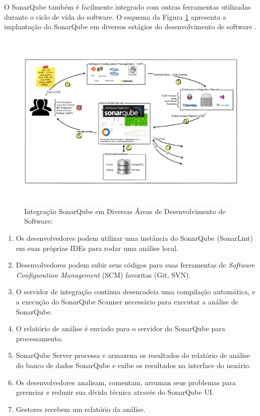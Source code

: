 O SonarQube também é facilmente integrado com outras ferramentas utilizadas durante o ciclo de vida do software. O esquema da Figura \ref{img:sonar_int} apresenta a implantação do SonarQube em diversos estágios do desenvolvimento de software \cite{sonar}.
\graphicspath{{figuras/}}
\begin{figure}[h]
\centering
\includegraphics[scale=0.45]{sonar_int}
\caption{Integração SonarQube em Diversas Áreas de Desenvolvimento de Software: \cite{sonar}}
\label{img:sonar_int}
\end{figure}
\begin{enumerate}
\item Os desenvolvedores podem utilizar uma instância do SonarQube (SonarLint) em suas próprias IDEs para rodar uma análise local.
\item Desenvolvedores podem subir seus códigos para suas ferramentas de \textit{Software Configuration Management} (SCM) favoritas (Git, SVN).
\item O servidor de integração contínua desencadeia uma compilação automática, e a execução do SonarQube Scanner necessário para executar a análise de SonarQube.
\item O relatório de análise é enviado para o servidor do SonarQube para processamento.
\item SonarQube Server processa e armazena os resultados do relatório de análise do banco de dados SonarQube e exibe os resultados na interface do usuário.
\item Os desenvolvedores analisam, comentam, arruman seus problemas para gerenciar e reduzir sua dívida técnica através do SonarQube UI.
\item Gestores recebem um relatório da análise.
\end{enumerate}

